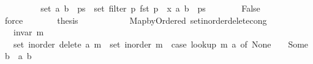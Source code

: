 \begin{isabellebody}
\ \ \ \ \isamarkupfalse%
\ \isamarkupfalse%
\ {\isachardoublequoteopen}{\isachardot}{\kern0pt}{\isachardot}{\kern0pt}{\isachardot}{\kern0pt}\ {\isacharequal}{\kern0pt}\ set\ {\isacharparenleft}{\kern0pt}{\isacharparenleft}{\kern0pt}a{\isacharcomma}{\kern0pt}\ b{\isacharparenright}{\kern0pt}\ {\isacharhash}{\kern0pt}\ ps{\isacharparenright}{\kern0pt}\ {\isacharminus}{\kern0pt}\ set\ {\isacharparenleft}{\kern0pt}filter\ {\isacharparenleft}{\kern0pt}{\isasymlambda}p{\isachardot}{\kern0pt}\ fst\ p\ {\isacharequal}{\kern0pt}\ x{\isacharparenright}{\kern0pt}\ {\isacharparenleft}{\kern0pt}{\isacharparenleft}{\kern0pt}a{\isacharcomma}{\kern0pt}\ b{\isacharparenright}{\kern0pt}\ {\isacharhash}{\kern0pt}\ ps{\isacharparenright}{\kern0pt}{\isacharparenright}{\kern0pt}{\isachardoublequoteclose}\isanewline
\ \ \ \ \ \ \isamarkupfalse%
\ False\isanewline
\ \ \ \ \ \ \isamarkupfalse%
\ force\isanewline
\ \ \ \ \isamarkupfalse%
\ \isamarkupfalse%
\ {\isacharquery}{\kern0pt}thesis\isanewline
\ \ \ \ \ \ \isacommand{{\isachardot}{\kern0pt}}\isamarkupfalse%
\isanewline
\ \ \isamarkupfalse%
\isanewline
{}\isamarkupfalse%
%
\endisatagproof
{\isafoldproof}%
%
\isadelimproof
\isanewline
%
\endisadelimproof
\isanewline
{}\isamarkupfalse%
\ {\isacharparenleft}{\kern0pt}\ Map{\isacharunderscore}{\kern0pt}by{\isacharunderscore}{\kern0pt}Ordered{\isacharparenright}{\kern0pt}\ set{\isacharunderscore}{\kern0pt}inorder{\isacharunderscore}{\kern0pt}delete{\isacharunderscore}{\kern0pt}cong{\isacharcolon}{\kern0pt}\isanewline
\ \ \ {\isachardoublequoteopen}invar\ m{\isachardoublequoteclose}\isanewline
\ \ \ {\isachardoublequoteopen}set\ {\isacharparenleft}{\kern0pt}inorder\ {\isacharparenleft}{\kern0pt}delete\ a\ m{\isacharparenright}{\kern0pt}{\isacharparenright}{\kern0pt}\ {\isacharequal}{\kern0pt}\ set\ {\isacharparenleft}{\kern0pt}inorder\ m{\isacharparenright}{\kern0pt}\ {\isacharminus}{\kern0pt}\ {\isacharparenleft}{\kern0pt}case\ lookup\ m\ a\ of\ None\ {\isasymRightarrow}\ {\isacharbraceleft}{\kern0pt}{\isacharbraceright}{\kern0pt}\ {\isacharbar}{\kern0pt}\ Some\ b\ {\isasymRightarrow}\ {\isacharbraceleft}{\kern0pt}{\isacharparenleft}{\kern0pt}a{\isacharcomma}{\kern0pt}\ b{\isacharparenright}{\kern0pt}{\isacharbraceright}{\kern0pt}{\isacharparenright}{\kern0pt}{\isachardoublequoteclose}\isanewline
%
\isadelimproof
%
\endisadelimproof
%
\isatagproof
{}\isamarkupfalse%

\end{isabellebody}
